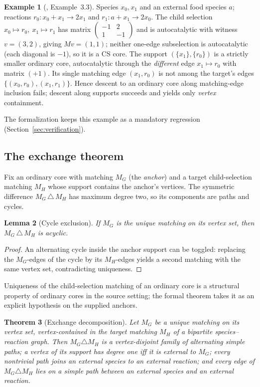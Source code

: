 \documentclass[11pt,a4paper]{article}
\theoremstyle{plain}
\newtheorem{theorem}{Theorem}[section]
\newtheorem{lemma}[theorem]{Lemma}
\theoremstyle{definition}
\newtheorem{example}[theorem]{Example}
\theoremstyle{remark}
\begin{document}
\begin{example}[\cite{golnik2026cores}, Example~3.3]\label{ex:golnik33}
Species $x_0,x_1$ and an external food species $a$; reactions $r_0: x_0+x_1\to 2x_1$ and $r_1: a+x_1\to 2x_0$. The child selection $x_0\mapsto r_0,\ x_1\mapsto r_1$ has matrix $\begin{pmatrix}-1&2\\ 1&-1\end{pmatrix}$ and is autocatalytic with witness $v=(3,2)$, giving $Mv=(1,1)$; neither one-edge subselection is autocatalytic (each diagonal is $-1$), so it is a CS core. The support $(\{x_1\},\{r_0\})$ is a strictly smaller ordinary core, autocatalytic through the \emph{different} edge $x_1\mapsto r_0$ with matrix $(+1)$. Its single matching edge $(x_1,r_0)$ is not among the target's edges $\{(x_0,r_0),(x_1,r_1)\}$. Hence descent to an ordinary core along matching-edge inclusion fails; descent along supports succeeds and yields only \emph{vertex} containment.
\end{example}

The formalization keeps this example as a mandatory regression (Section~\ref{sec:verification}).

\subsection{The exchange theorem}

Fix an ordinary core with matching $M_G$ (the \emph{anchor}) and a target child-selection matching $M_H$ whose support contains the anchor's vertices. The symmetric difference $M_G\,\triangle\,M_H$ has maximum degree two, so its components are paths and cycles.

\begin{lemma}[Cycle exclusion]\label{lem:cycle}
If $M_G$ is the unique matching on its vertex set, then $M_G\,\triangle\,M_H$ is acyclic.
\end{lemma}
\begin{proof}
An alternating cycle inside the anchor support can be toggled: replacing the $M_G$-edges of the cycle by its $M_H$-edges yields a second matching with the same vertex set, contradicting uniqueness.
\end{proof}

Uniqueness of the child-selection matching of an ordinary core is a structural property of ordinary cores in the source setting; the formal theorem takes it as an explicit hypothesis on the supplied anchors.

\begin{theorem}[Exchange decomposition]\label{thm:exchange}
Let $M_G$ be a unique matching on its vertex set, vertex-contained in the target matching $M_H$ of a bipartite species--reaction graph. Then $M_G\triangle M_H$ is a vertex-disjoint family of alternating simple paths; a vertex of its support has degree one iff it is external to $M_G$; every nontrivial path joins an external species to an external reaction; and every edge of $M_G\triangle M_H$ lies on a simple path between an external species and an external reaction.
\end{theorem}
\end{document}
